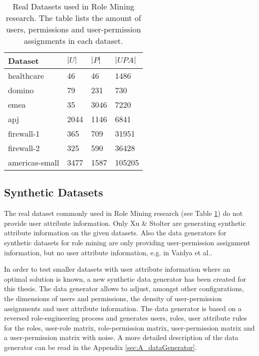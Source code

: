 \begin{table}[H]
    \centering
    \begin{tabular}{|l|l|l|l|}
        \hline
        \rowcolor{myGray} 
        \textbf{Dataset} & \textbf{$|U|$} & \textbf{$|P|$} & \textbf{$|UPA|$} \\ \hline
        healthcare       & 46             & 46                   & 1486                                 \\ \hline
        domino           & 79             & 231                  & 730                                  \\ \hline
        emea             & 35             & 3046                 & 7220                                 \\ \hline
        apj              & 2044           & 1146                 & 6841                                 \\ \hline
        firewall-1       & 365            & 709                  & 31951                                \\ \hline
        firewall-2       & 325            & 590                  & 36428                                \\ \hline
        americas-small   & 3477           & 1587                 & 105205                               \\ \hline
    \end{tabular}
    \caption{Real Datasets used in Role Mining research. The table lists the amount of users, permissions and user-permission assignments in each dataset.}
    \label{tab:realDatasets}
\end{table}

\subsection{Synthetic Datasets}
The real dataset commonly used in Role Mining research (see Table \ref{tab:realDatasets}) do not provide user attribute information. Only Xu \& Stolter\cite{Xu} are generating synthetic attribute information on the given datasets. Also the data generators for synthetic datasets for role mining are only providing user-permission assignment information, but no user attribute information, e.g. in Vaidya et al.\cite{Vaidya:2006:RMR:1180405.1180424}.

In order to test smaller datasets with user attribute information where an optimal solution is known, a new synthetic data generator has been created for this thesis. The data generator allows to adjust, amongst other configurations, the dimensions of users and permissions, the density of user-permission assignments and user attribute information. The data generator is based on a reversed role-engineering process and generates users, roles, user attribute rules for the roles, user-role matrix, role-permission matrix, user-permission matrix and a user-permission matrix with noise. A more detailed description of the data generator can be read in the Appendix \ref{sec:A_dataGenerator}.

